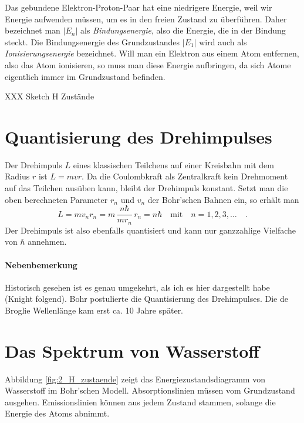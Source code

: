 Das gebundene Elektron-Proton-Paar hat eine niedrigere Energie, weil wir Energie aufwenden müssen, um es in den freien Zustand zu überführen. Daher bezeichnet man $|E_n|$ als \emph{Bindungsenergie}, also die Energie, die in der Bindung steckt. Die Bindungsenergie des Grundzustandes $|E_1|$ wird auch als \emph{Ionisierungsenergie} bezeichnet. Will man ein Elektron aus einem Atom entfernen, also das Atom ionisieren, so muss man diese Energie aufbringen, da sich Atome eigentlich immer im Grundzustand befinden. 

\begin{marginfigure}
    \caption{XXX Sketch H Zustände}
    \label{fig:2_H_zustaende}
 \end{marginfigure}


\section{Quantisierung des Drehimpulses}

Der Drehimpuls $L$ eines klassischen Teilchens auf einer Kreisbahn mit dem Radius $r$ ist $L = m v r$.
Da die Coulombkraft als Zentralkraft kein Drehmoment auf das Teilchen ausüben kann, bleibt der Drehimpuls konstant. Setzt man die oben berechneten Parameter $r_n$ und $v_n$ der Bohr'schen Bahnen ein, so erhält man
\begin{equation}
    L = m v_n r_n = m  \, \frac{n \hbar}{m r_n} \, r_n = n \hbar \quad \text{mit} \quad n = 1, 2, 3, \dots \quad .
\end{equation}
Der Drehimpuls ist also ebenfalls quantisiert und kann nur ganzzahlige Vielfache von $\hbar$ annehmen.

\paragraph*{Nebenbemerkung} Historisch gesehen ist es genau umgekehrt, als ich es hier dargestellt habe (Knight folgend). Bohr postulierte die Quantisierung des Drehimpulses. Die de Broglie Wellenlänge kam erst ca. 10 Jahre später.


\section{Das Spektrum von Wasserstoff}

Abbildung \ref{fig:2_H_zustaende} zeigt das Energiezustandsdiagramm von Wasserstoff im Bohr'schen Modell. Absorptionslinien müssen vom Grundzustand ausgehen. Emissionslinien können aus jedem Zustand stammen, solange die Energie des Atoms abnimmt.

